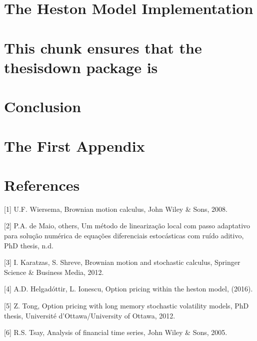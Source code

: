 \documentclass[12pt,twoside]{reedthesis}
\theoremstyle{definition}
\theoremstyle{definition}
\theoremstyle{remark}
\begin{document}
  \chapter{The Heston Model
  Implementation}\label{the-heston-model-implementation}
  
  \chapter{This chunk ensures that the thesisdown package
  is}\label{this-chunk-ensures-that-the-thesisdown-package-is}
  
  \chapter{Conclusion}\label{conclusion}
  
  \chapter{The First Appendix}\label{the-first-appendix}
  
  \chapter*{References}\label{references}
  
  \hypertarget{refs}{}
  \hypertarget{ref-ubbo}{}
  {[}1{]} U.F. Wiersema, Brownian motion calculus, John Wiley \& Sons,
  2008.
  
  \hypertarget{ref-maiometodo}{}
  {[}2{]} P.A. de Maio, others, Um método de linearização local com passo
  adaptativo para solução numérica de equações diferenciais estocásticas
  com ruído aditivo, PhD thesis, n.d.
  
  \hypertarget{ref-karatzas2012brownian}{}
  {[}3{]} I. Karatzas, S. Shreve, Brownian motion and stochastic calculus,
  Springer Science \& Business Media, 2012.
  
  \hypertarget{ref-helgadottir2016option}{}
  {[}4{]} A.D. Helgadóttir, L. Ionescu, Option pricing within the heston
  model, (2016).
  
  \hypertarget{ref-tong2012option}{}
  {[}5{]} Z. Tong, Option pricing with long memory stochastic volatility
  models, PhD thesis, Université d'Ottawa/University of Ottawa, 2012.
  
  \hypertarget{ref-tsay2005analysis}{}
  {[}6{]} R.S. Tsay, Analysis of financial time series, John Wiley \&
  Sons, 2005.
  
\end{document}
